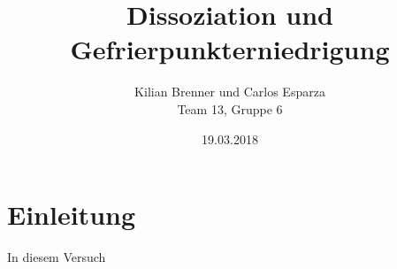 \documentclass[12pt,a4paper]{article}
\title{Dissoziation und Gefrierpunkterniedrigung}
\author{Kilian Brenner und Carlos Esparza \\ Team 13, Gruppe 6}
\date{19.03.2018}
\begin{document}
\maketitle
\tableofcontents
\newpage

\section{Einleitung}
In diesem Versuch 













\begin{appendix}

\end{appendix}
\end{document}
